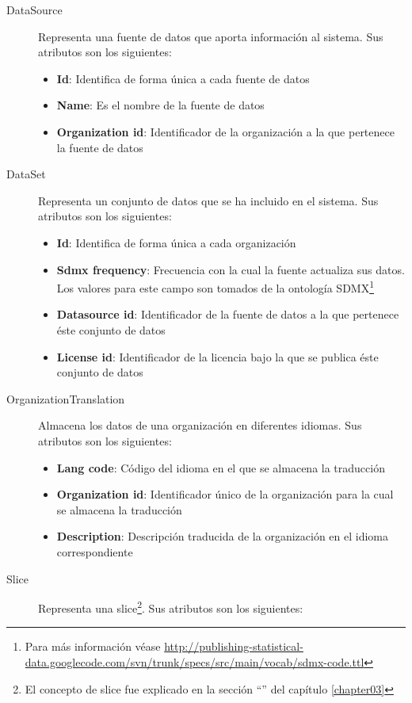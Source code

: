 \begin{description}
\begin{itemize}
		\end{itemize}
	\item[DataSource]  Representa una fuente de datos que aporta información al sistema.  Sus atributos son los siguientes:
		\begin{itemize}
			\item \textbf{Id}:  Identifica de forma única a cada fuente de datos
			\item \textbf{Name}:  Es el nombre de la fuente de datos
			\item \textbf{Organization id}:  Identificador de la organización a la que pertenece la fuente de datos
		\end{itemize}
	\item[DataSet]  Representa un conjunto de datos que se ha incluido en el sistema.  Sus atributos son los siguientes:
		\begin{itemize}
			\item \textbf{Id}:  Identifica de forma única a cada organización
			\item \textbf{Sdmx frequency}:  Frecuencia con la cual la fuente actualiza sus datos.  Los valores para este campo son tomados de la ontología SDMX\footnote{Para más información véase \url{http://publishing-statistical-data.googlecode.com/svn/trunk/specs/src/main/vocab/sdmx-code.ttl}}
			\item \textbf{Datasource id}:  Identificador de la fuente de datos a la que pertenece éste conjunto de datos
			\item \textbf{License id}:  Identificador de la licencia bajo la que se publica éste conjunto de datos
		\end{itemize}
	\item[OrganizationTranslation]  Almacena los datos de una organización en diferentes idiomas.  Sus atributos son los siguientes:
		\begin{itemize}
			\item \textbf{Lang code}:  Código del idioma en el que se almacena la traducción
			\item \textbf{Organization id}:  Identificador único de la organización para la cual se almacena la traducción
			\item \textbf{Description}:  Descripción traducida de la organización en el idioma correspondiente
		\end{itemize}
	\item[Slice]  Representa una slice\footnote{El concepto de slice fue explicado en la sección ``'' del capítulo \ref{chapter03}}.  Sus atributos son los siguientes:

\end{description}
